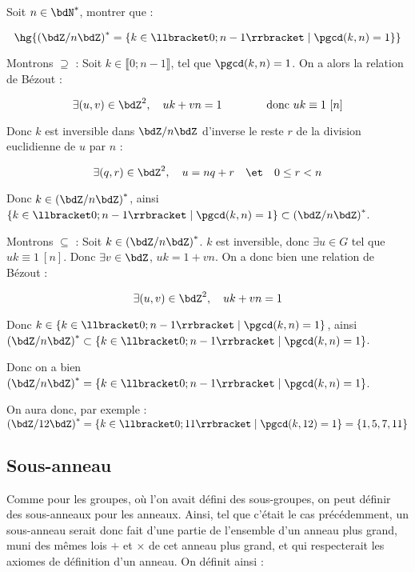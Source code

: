 \documentclass[a4paper,french,bookmarks]{article}
\begin{document}
\begin{exercise}{}{}
    Soit $n \in \bdN^*$, montrer que :
    
    \[\hg{\left(\bdZ/n\bdZ\right)^* = \{ k \in \llbracket0; n-1\rrbracket \mid \pgcd(k, n) = 1 \}}\]
    
    \tcblower
    \begin{enumerate}
        \ithand Montrons $\boxed{\supseteq}$ : Soit $k \in \llbracket0; n-1\rrbracket$, tel que $\pgcd(k, n) = 1$. On a alors la relation de Bézout :
        
        \[ \exists (u, v) \in \bdZ^2,\quad uk + vn = 1 \qquad\qquad\text{donc} \ uk \equiv 1 \ [n]\]
        
        Donc $k$ est inversible dans $\bdZ/n\bdZ$ d'inverse le reste $r$ de la division euclidienne de $u$ par $n$ :
        
        \[\exists (q,r) \in \bdZ^2,\quad u = nq + r \quad\et\quad 0 \leq r < n\]
        
        Donc $k \in \left(\bdZ/n\bdZ\right)^*$, ainsi $\{ k \in \llbracket0; n-1\rrbracket \mid \pgcd(k, n) = 1 \} \subset \left(\bdZ/n\bdZ\right)^*$.
        
        \ithand Montrons $\boxed{\subseteq}$ : Soit $k \in \left(\bdZ/n\bdZ\right)^*$. $k$ est inversible, donc $\exists u \in G$ tel que $uk \equiv 1 \ [n]$. Donc $\exists v \in \bdZ$, $uk = 1 + vn$. On a donc bien une relation de Bézout :
        
        \[\exists (u, v) \in \bdZ^2,\quad uk + vn = 1\]
        
        Donc $k \in \{ k \in \llbracket0; n-1\rrbracket \mid \pgcd(k, n) = 1 \}$, ainsi $\left(\bdZ/n\bdZ\right)^* \subset \{ k \in \llbracket0; n-1\rrbracket \mid \pgcd(k, n) = 1 \}$.
    \end{enumerate}
    
    Donc on a bien $\left(\bdZ/n\bdZ\right)^* = \{ k \in \llbracket0; n-1\rrbracket \mid \pgcd(k, n) = 1 \}$.
\end{exercise}

On aura donc, par exemple : \qquad $\left(\bdZ/12\bdZ\right)^* = \{k \in \llbracket 0; 11\rrbracket \mid \pgcd(k, 12) = 1\} = \{1, 5, 7, 11\}$
\subsection{Sous-anneau}

Comme pour les groupes, où l'on avait défini des sous-groupes, on peut définir des sous-anneaux pour les anneaux. Ainsi, tel que c'était le cas précédemment, un sous-anneau serait donc fait d'une partie de l'ensemble d'un anneau plus grand, muni des mêmes lois $+$ et $\times$ de cet anneau plus grand, et qui respecterait les axiomes de définition d'un anneau. On définit ainsi :  
\end{document}
